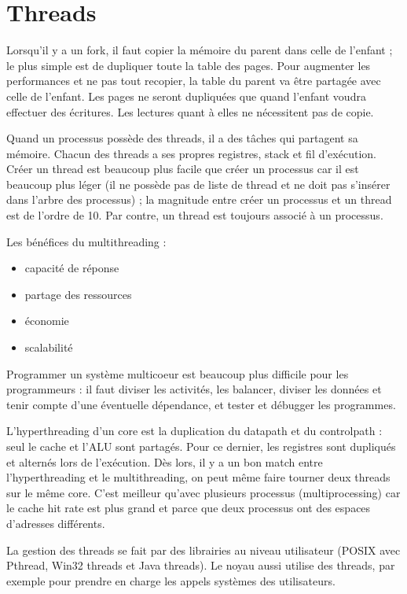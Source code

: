 \chapter{Threads}


Lorsqu'il y a un fork, il faut copier la mémoire du parent dans celle de l'enfant ; le plus simple est de dupliquer toute la table des pages. Pour augmenter les performances et ne pas tout recopier, la table du parent va être partagée avec celle de l'enfant. Les pages ne seront dupliquées que quand l'enfant voudra effectuer des écritures. Les lectures quant à elles ne nécessitent pas de copie.

Quand un processus possède des threads, il a des tâches qui partagent sa mémoire. Chacun des threads a ses propres registres, stack et fil d'exécution. Créer un thread est beaucoup plus facile que créer un processus car il est beaucoup plus léger (il ne possède pas de liste de thread et ne doit pas s'insérer dans l'arbre des processus) ; la magnitude entre créer un processus et un thread est de l'ordre de 10. Par contre, un thread est toujours associé à un processus.

Les bénéfices du multithreading :

\begin{itemize}
	\item capacité de réponse
	\item partage des ressources
	\item économie
	\item scalabilité
\end{itemize}

Programmer un système multicoeur est beaucoup plus difficile pour les programmeurs : il faut diviser les activités, les balancer, diviser les données et tenir compte d'une éventuelle dépendance, et tester et débugger les programmes.

L'hyperthreading d'un core est la duplication du datapath et du controlpath : seul le cache et l'ALU sont partagés. Pour ce dernier, les registres sont dupliqués et alternés lors de l'exécution. Dès lors, il y a un bon match entre l'hyperthreading et le multithreading, on peut même faire tourner deux threads sur le même core. C'est meilleur qu'avec plusieurs processus (multiprocessing)  car le cache hit rate est plus grand et parce que deux processus ont des espaces d'adresses différents.

La gestion des threads se fait par des librairies au niveau utilisateur (POSIX avec Pthread, Win32 threads et Java threads). Le noyau aussi utilise des threads, par exemple pour prendre en charge les appels systèmes des utilisateurs.

